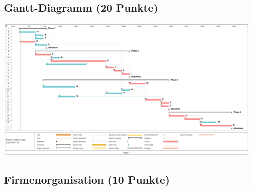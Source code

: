 \documentclass{scrartcl}
\begin{document}
\subsection{Gantt-Diagramm (20 Punkte)}
\includegraphics[width=\linewidth]{gantt}

\subsection{Firmenorganisation (10 Punkte)}
\end{document}
